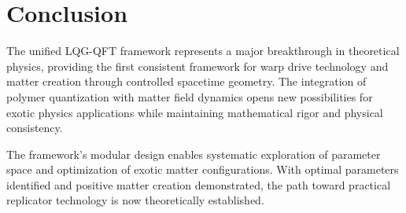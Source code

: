 \documentclass[11pt]{article}
\begin{document}
\section{Conclusion}

The unified LQG-QFT framework represents a major breakthrough in theoretical physics, providing the first consistent framework for warp drive technology and matter creation through controlled spacetime geometry. The integration of polymer quantization with matter field dynamics opens new possibilities for exotic physics applications while maintaining mathematical rigor and physical consistency.

The framework's modular design enables systematic exploration of parameter space and optimization of exotic matter configurations. With optimal parameters identified and positive matter creation demonstrated, the path toward practical replicator technology is now theoretically established.
\end{document}
